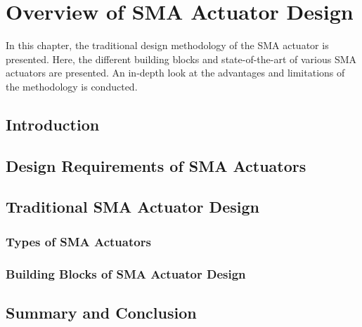 
\chapter{Overview of SMA Actuator Design}\label{chap:sma-actuator-design}
In this chapter, the traditional design methodology of the SMA actuator is presented. Here, the different building blocks and state-of-the-art of various SMA actuators are presented. An in-depth look at the advantages and limitations of the methodology is conducted.
\section{Introduction}
\section{Design Requirements of SMA Actuators}
\section{Traditional SMA Actuator Design}
\subsection{Types of SMA Actuators}
\subsection{Building Blocks of SMA Actuator Design}
\section{Summary and Conclusion}
